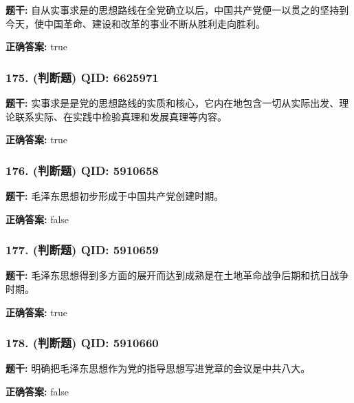 \documentclass[12pt,UTF8]{ctexart}
\begin{document}
\textbf{题干:}
自从实事求是的思想路线在全党确立以后，中国共产党便一以贯之的坚持到今天，使中国革命、建设和改革的事业不断从胜利走向胜利。

\textbf{正确答案:}
true

\vspace{0.3em}\hrulefill\vspace{0.7em}

\subsubsection*{175. (判断题) \small QID: 6625971}

\textbf{题干:}
实事求是是党的思想路线的实质和核心，它内在地包含一切从实际出发、理论联系实际、在实践中检验真理和发展真理等内容。

\textbf{正确答案:}
true

\vspace{0.3em}\hrulefill\vspace{0.7em}

\subsubsection*{176. (判断题) \small QID: 5910658}

\textbf{题干:}
毛泽东思想初步形成于中国共产党创建时期。

\textbf{正确答案:}
false

\vspace{0.3em}\hrulefill\vspace{0.7em}

\subsubsection*{177. (判断题) \small QID: 5910659}

\textbf{题干:}
毛泽东思想得到多方面的展开而达到成熟是在土地革命战争后期和抗日战争时期。

\textbf{正确答案:}
true

\vspace{0.3em}\hrulefill\vspace{0.7em}

\subsubsection*{178. (判断题) \small QID: 5910660}

\textbf{题干:}
明确把毛泽东思想作为党的指导思想写进党章的会议是中共八大。

\textbf{正确答案:}
false
\end{document}
